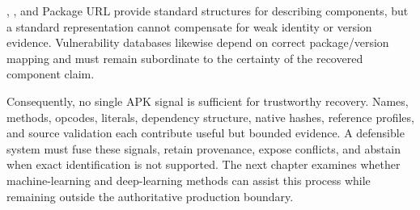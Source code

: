 \SPDX, \CycloneDX, and Package URL provide standard structures for describing
components, but a standard representation cannot compensate for weak
identity or version evidence. Vulnerability databases likewise depend on
correct package/version mapping and must remain subordinate to the certainty
of the recovered component claim.

Consequently, no single APK signal is sufficient for trustworthy recovery.
Names, methods, opcodes, literals, dependency structure, native hashes,
reference profiles, and source validation each contribute useful but bounded
evidence. A defensible system must fuse these signals, retain provenance,
expose conflicts, and abstain when exact identification is not supported. The
next chapter examines whether machine-learning and deep-learning methods can
assist this process while remaining outside the authoritative production
boundary.
